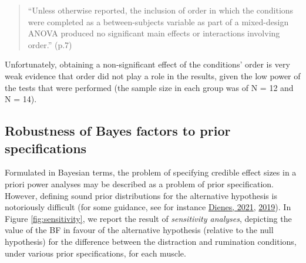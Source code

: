 \documentclass[
  english,
  man, donotrepeattitle,floatsintext]{apa6}
\begin{document}
\begin{quote}
``Unless otherwise reported, the inclusion of order in which the conditions were completed as a between-subjects variable as part of a mixed-design ANOVA produced no significant main effects or interactions involving order.'' (p.7)
\end{quote}

Unfortunately, obtaining a non-significant effect of the conditions' order is very weak evidence that order did not play a role in the results, given the low power of the tests that were performed (the sample size in each group was of N = 12 and N = 14).

\hypertarget{robustness-of-bayes-factors-to-prior-specifications}{%
\subsection{Robustness of Bayes factors to prior specifications}\label{robustness-of-bayes-factors-to-prior-specifications}}

Formulated in Bayesian terms, the problem of specifying credible effect sizes in a priori power analyses may be described as a problem of prior specification. However, defining sound prior distributions for the alternative hypothesis is notoriously difficult (for some guidance, see for instance \protect\hyperlink{ref-dienes_obtaining_2021}{Dienes, 2021}, \protect\hyperlink{ref-dienes_how_2019}{2019}). In Figure \ref{fig:sensitivity}, we report the result of \emph{sensitivity analyses}, depicting the value of the BF in favour of the alternative hypothesis (relative to the null hypothesis) for the difference between the distraction and rumination conditions, under various prior specifications, for each muscle.
\end{document}
